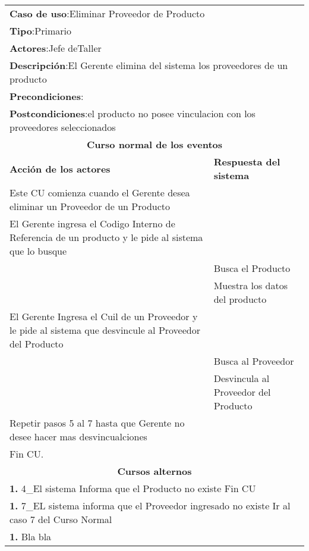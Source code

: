 \begin{longtable}{ |p{8cm}|p{8cm}| }
		\hline
		\multicolumn{2}{|p{16cm}|}{\textbf{Caso de uso}:Eliminar Proveedor de Producto }\\
		\multicolumn{2}{|p{16cm}|}{\textbf{Tipo}:Primario }\\
		\multicolumn{2}{|p{16cm}|}{\textbf{Actores}:Jefe deTaller }\\
		\multicolumn{2}{|p{16cm}|}{\textbf{Descripción}:El Gerente elimina del sistema los proveedores de un producto }\\
		\multicolumn{2}{|p{16cm}|}{\textbf{Precondiciones}: }\\
		\multicolumn{2}{|p{16cm}|}{\textbf{Postcondiciones}:el producto no posee vinculacion con los proveedores seleccionados }\\
		\hline
		\multicolumn{2}{|c|}{\textbf{Curso normal de los eventos}}\\
		\hline
		\textbf{Acción de los actores} & \textbf{Respuesta del sistema}\\
		\hline
			\inc Este CU comienza cuando el Gerente desea eliminar un Proveedor de un Producto & \\
			\hline
			\inc El Gerente ingresa el Codigo Interno de Referencia de un producto y le pide al sistema que lo busque & \\
			\hline
			& \inc Busca el Producto \\
			\hline
			& \inc Muestra los datos del producto \\
			\hline
			\inc El Gerente Ingresa el Cuil de un Proveedor y le pide al sistema que desvincule al Proveedor del Producto & \\
			\hline
			& \inc Busca al Proveedor \\
			\hline
			& \inc Desvincula al Proveedor del Producto \\
			\hline
			\inc Repetir pasos 5 al 7 hasta que Gerente no desee hacer mas desvincualciones  & \\
			\hline
			\inc Fin CU. & \\
		\hline
		\multicolumn{2}{|c|}{\textbf{Cursos alternos}}\\
		\hline
		\multicolumn{2}{|p{16cm}|}{\textbf{1. }4_El sistema Informa que el Producto no existe Fin CU}\\
		\hline
		\multicolumn{2}{|p{16cm}|}{\textbf{1. }7_EL sistema informa que el Proveedor ingresado no existe Ir al caso 7 del Curso Normal}\\
		\hline
		\multicolumn{2}{|p{16cm}|}{\textbf{1. }Bla bla }\\
		\hline	
	\end{longtable}